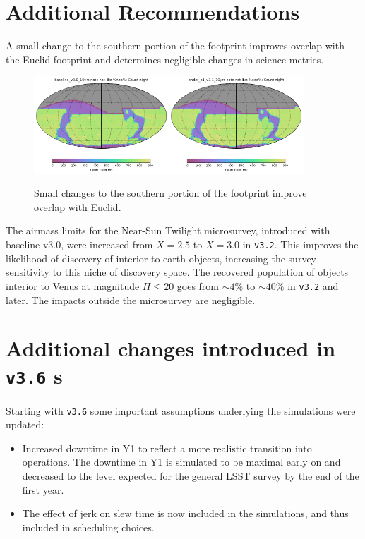 \section{Additional Recommendations}\label{sec:additional}

A small change to the southern portion of the footprint improves overlap with the Euclid footprint and determines negligible changes in science metrics. 
\begin{figure}
\centering
\includegraphics[width=0.45\textwidth]{figures/3.0_south.png}\includegraphics[width=0.45\textwidth]{figures/3.1_south.png}
\caption{Small changes to the southern portion of the footprint improve overlap with Euclid.}
\end{figure}

The airmass limits for the Near-Sun Twilight microsurvey, introduced with baseline v3.0, were increased from $X=2.5$ to $X=3.0$ in \texttt{v3.2}. This improves the likelihood of discovery of interior-to-earth objects, increasing the survey sensitivity to this niche of discovery space. The recovered population of objects
interior to Venus at magnitude $H\leq20$ goes from $\sim4\%$ to $\sim40\%$ in \texttt{v3.2} and later. The impacts outside the microsurvey are negligible.

\section{Additional changes introduced in \texttt{v3.6} \opsim s }\label{sec:opsimchanges}
Starting with \texttt{v3.6} some important assumptions underlying the simulations were updated: 
\begin{itemize}
\item Increased downtime in Y1 to reflect a more realistic transition into operations. The downtime in Y1 is simulated to be maximal early on and decreased to the level expected for the general LSST survey by the end of the first year. 
\item The effect of jerk on slew time is now included in the simulations, and thus included in scheduling choices.
\end{itemize}

